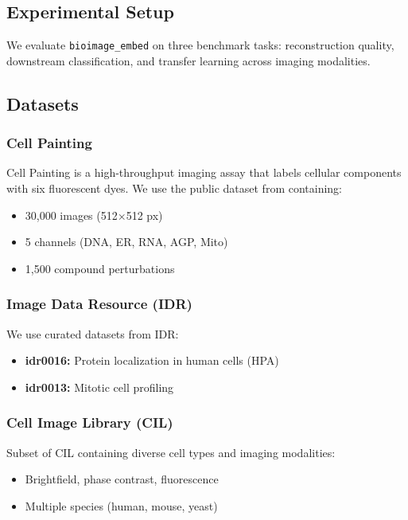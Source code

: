\subsection{Experimental Setup}

We evaluate \texttt{bioimage\_embed} on three benchmark tasks: reconstruction quality, downstream classification, and transfer learning across imaging modalities.

\subsection{Datasets}

\subsubsection{Cell Painting}

Cell Painting is a high-throughput imaging assay that labels cellular components with six fluorescent dyes. We use the public dataset from \citet{bray2017cell} containing:
\begin{itemize}
    \item 30,000 images (512×512 px)
    \item 5 channels (DNA, ER, RNA, AGP, Mito)
    \item 1,500 compound perturbations
\end{itemize}

\subsubsection{Image Data Resource (IDR)}

We use curated datasets from IDR:
\begin{itemize}
    \item \textbf{idr0016:} Protein localization in human cells (HPA)
    \item \textbf{idr0013:} Mitotic cell profiling
\end{itemize}

\subsubsection{Cell Image Library (CIL)}

Subset of CIL containing diverse cell types and imaging modalities:
\begin{itemize}
    \item Brightfield, phase contrast, fluorescence
    \item Multiple species (human, mouse, yeast)
\end{itemize}

